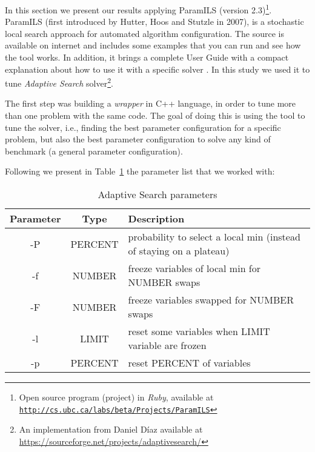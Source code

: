 


In this section we present our results applying {\sc ParamILS} (version 2.3)\footnote{Open source program (project) in {\it Ruby}, available at \href{http://cs.ubc.ca/labs/beta/Projects/ParamILS}{\texttt{http://cs.ubc.ca/labs/beta/Projects/ParamILS}}}. {\sc ParamILS} (first introduced by Hutter, Hoos and St\:utzle in 2007), is a stochastic local search approach for automated algorithm configuration. The source is available on internet and includes some examples that you can run and see how the tool works. In addition, it brings a complete User Guide with a compact explanation about how to use it with a specific solver \cite{Hutter2008,Hutter2009}. In this study we used it to tune {\it Adaptive Search} solver\footnote{An implementation from Daniel D\'{i}az available at \href{https://sourceforge.net/projects/adaptivesearch/}{https://sourceforge.net/projects/adaptivesearch/}}. %

The first step was building a {\it wrapper} in C++ language, in order to tune more than one problem with the same code. The goal of doing this is using the tool to tune the solver, i.e., finding the best parameter configuration for a specific problem, but also the best parameter configuration to solve any kind of benchmark (a general parameter configuration).

\nocite{Rickard}

Following we present in Table~\ref{table:param} the parameter list that we worked with:

\begin{table}[ht] 
\caption{Adaptive Search parameters}
\centering 
\begin{tabular}{c c l}
\hline\hline
Parameter & Type & Description \\ [0.5ex]
\hline
-P & PERCENT & probability to select a local min (instead of staying on a plateau) \\
-f & NUMBER & freeze variables of local min for NUMBER swaps \\ 
-F & NUMBER & freeze variables swapped for NUMBER swaps \\ 
-l & LIMIT & reset some variables when LIMIT variable are frozen \\ 
-p & PERCENT & reset PERCENT of variables \\ [1ex]
\hline
\end{tabular} 
\label{table:param}
\end{table} 

